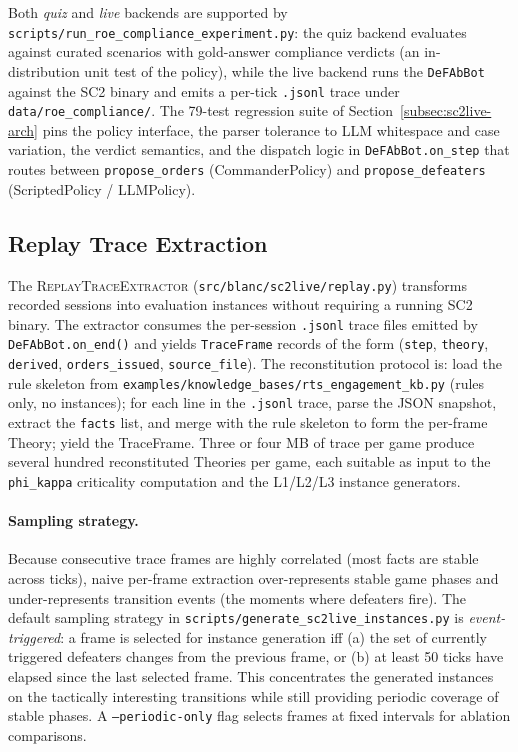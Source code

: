 \documentclass{article}
\theoremstyle{definition}
\begin{document}
Both \emph{quiz} and \emph{live} backends are supported by \texttt{scripts/run\_roe\_compliance\_experiment.py}: the quiz backend evaluates against curated scenarios with gold-answer compliance verdicts (an in-distribution unit test of the policy), while the live backend runs the \texttt{DeFAbBot} against the SC2 binary and emits a per-tick \texttt{.jsonl} trace under \texttt{data/roe\_compliance/}. The 79-test regression suite of Section~\ref{subsec:sc2live-arch} pins the policy interface, the parser tolerance to LLM whitespace and case variation, the verdict semantics, and the dispatch logic in \texttt{DeFAbBot.on\_step} that routes between \texttt{propose\_orders} (CommanderPolicy) and \texttt{propose\_defeaters} (ScriptedPolicy / LLMPolicy).


\subsection{Replay Trace Extraction}\label{subsec:sc2live-replay}

The \textsc{ReplayTraceExtractor} (\texttt{src/blanc/sc2live/replay.py}) transforms recorded sessions into evaluation instances without requiring a running SC2 binary. The extractor consumes the per-session \texttt{.jsonl} trace files emitted by \texttt{DeFAbBot.on\_end()} and yields \texttt{TraceFrame} records of the form (\texttt{step}, \texttt{theory}, \texttt{derived}, \texttt{orders\_issued}, \texttt{source\_file}). The reconstitution protocol is: load the rule skeleton from \texttt{examples/knowledge\_bases/rts\_engagement\_kb.py} (rules only, no instances); for each line in the \texttt{.jsonl} trace, parse the JSON snapshot, extract the \texttt{facts} list, and merge with the rule skeleton to form the per-frame Theory; yield the TraceFrame. Three or four MB of trace per game produce several hundred reconstituted Theories per game, each suitable as input to the \texttt{phi\_kappa} criticality computation and the L1/L2/L3 instance generators.

\paragraph{Sampling strategy.} Because consecutive trace frames are highly correlated (most facts are stable across ticks), naive per-frame extraction over-represents stable game phases and under-represents transition events (the moments where defeaters fire). The default sampling strategy in \texttt{scripts/generate\_sc2live\_instances.py} is \emph{event-triggered}: a frame is selected for instance generation iff (a) the set of currently triggered defeaters changes from the previous frame, or (b) at least 50 ticks have elapsed since the last selected frame. This concentrates the generated instances on the tactically interesting transitions while still providing periodic coverage of stable phases. A \texttt{--periodic-only} flag selects frames at fixed intervals for ablation comparisons.
\end{document}
